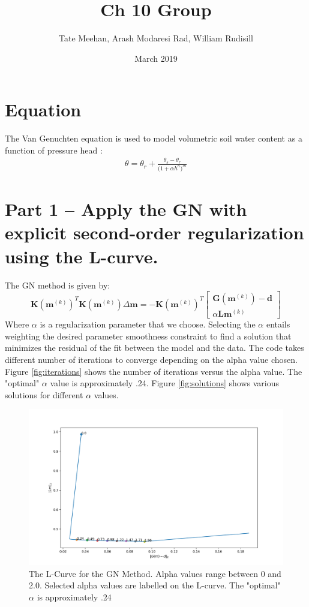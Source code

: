 \documentclass{article}
\title{Ch 10 Group}
\author{Tate Meehan, Arash Modaresi Rad, William Rudisill}
\date{March 2019}
\begin{document}
\maketitle

\section*{Equation}
The Van Genuchten equation is used to model volumetric soil water content as a function of pressure head \citep{dingman} : 
\begin{align}
\theta = \theta_r + \frac{\theta_s - \theta_r}{\big(1 + \alpha h^n\big)^m}
\end{align}

\section*{Part 1 -- Apply the GN with explicit second-order regularization using the L-curve.}
The GN method is given by:
\begin{equation}
\mathbf{K}\left(\mathbf{m}^{(k)}\right)^{T} \mathbf{K}\left(\mathbf{m}^{(k)}\right) \Delta \mathbf{m}=-\mathbf{K}\left(\mathbf{m}^{(k)}\right)^{T} \left[ \begin{array}{c}{\mathbf{G}\left(\mathbf{m}^{(k)}\right)-\mathbf{d}} \\ {\alpha \mathbf{L} \mathbf{m}^{(k)}}\end{array}\right]
\end{equation}
Where $\alpha$ is a regularization parameter that we choose. Selecting the $\alpha$ entails weighting the desired parameter smoothness constraint to find a solution that minimizes the residual of the fit between the model and the data. The code takes different number of iterations to converge depending on the alpha value chosen. Figure \ref{fig:iterations} shows the number of iterations versus the alpha value. The "optimal" $\alpha$ value is approximately .24. Figure \ref{fig:solutions} shows various solutions for different $\alpha$ values.   


\begin{figure}[ht!]
    \centering
    \includegraphics[width=4.5in]{LCurve_GNmethod.png}
    \caption{The L-Curve for the GN Method. Alpha values range between 0 and 2.0. Selected alpha values are labelled on the L-curve. The "optimal" $\alpha$ is approximately .24}
    \label{fig:lcurve}
\end{figure}
\end{document}
